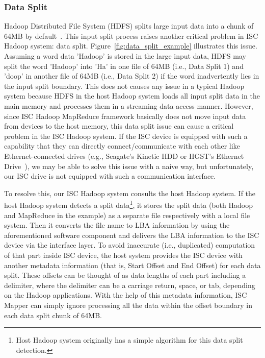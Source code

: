\subsubsection{Data Split}\label{subsubsec:data_split}
Hadoop Distributed File System (HDFS) splits large input data into a chunk of 64MB by default~\cite{TomWhite:HadoopDefinitiveGuide:2012}. This input split process raises another critical problem in ISC Hadoop system: data split. Figure~\ref{fig:data_split_example} illustrates this issue. Assuming a word data 'Hadoop' is stored in the large input data, HDFS may split the word 'Hadoop' into 'Ha' in one file of 64MB (i.e., Data Split 1) and 'doop' in another file of 64MB (i.e., Data Split 2) if the word inadvertently lies in the input split boundary. This does not causes any issue in a typical Hadoop system because HDFS in the host Hadoop system loads all input split data in the main memory and processes them in a streaming data access manner. However, since ISC Hadoop MapReduce framework basically does not move input data from devices to the host memory, this data split issue can cause a critical problem in the ISC Hadoop system. If the ISC device is equipped with such a capability that they can directly connect/communicate with each other like Ethernet-connected drives (e.g., Seagate's Kinetic HDD or HGST's Ethernet Drive~\cite{KineticHDD:Seagate:2014,EthernetDrive:HGST:2014}), we may be able to solve this issue with a naive way, but unfortunately, our ISC drive is not equipped with such a communication interface.

To resolve this, our ISC Hadoop system consults the host Hadoop system. If the host Hadoop system detects a split data\footnote{\small Host Hadoop system originally has a simple algorithm for this data split detection.}, it stores the split data (both Hadoop and MapReduce in the example) as a separate file respectively with a local file system. Then it converts the file name to LBA information by using the aforementioned software component and delivers the LBA information to the ISC device via the interface layer. To avoid inaccurate (i.e., duplicated) computation of that part inside ISC device, the host system provides the ISC device with another metadata information (that is, Start Offset and End Offset) for each data split. These offsets can be thought of as data lengths of each part including a delimiter, where the delimiter can be a carriage return, space, or tab, depending on the Hadoop applications. With the help of this metadata information, ISC Mapper can simply ignore processing all the data within the offset boundary in each data split chunk of 64MB.



